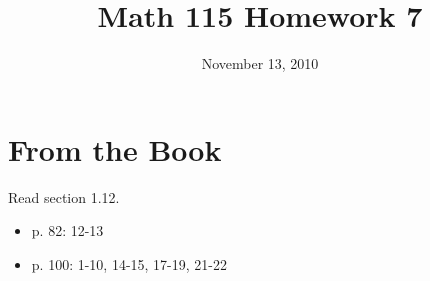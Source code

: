 \documentclass[fleqn,addpoints]{exam}
\title{Math 115 Homework 7}
\date{November 13, 2010}
\begin{document}
\maketitle
 
\section{From the Book}

\vspace{0.2 cm}

Read section 1.12.
 
\begin{itemize}
  \item p. 82: 12-13
  \item p. 100: 1-10, 14-15, 17-19, 21-22
\end{itemize}
\end{document}
